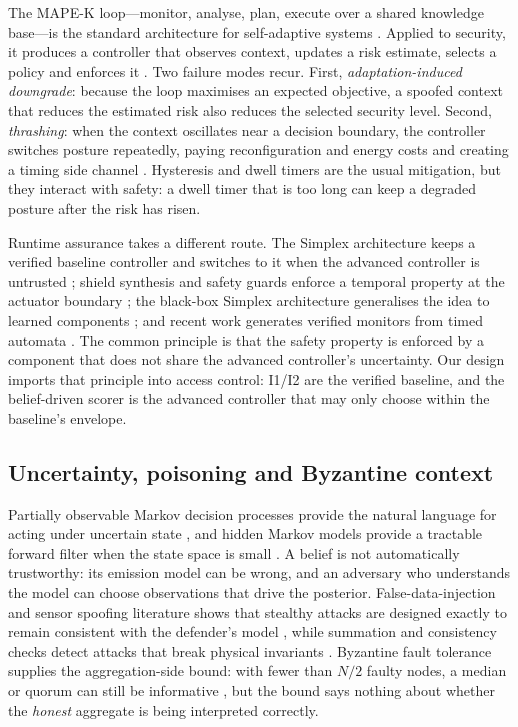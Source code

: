 The MAPE-K loop---monitor, analyse, plan, execute over a shared knowledge
base---is the standard architecture for self-adaptive systems
\cite{kephart2003vision,cheng2009software}. Applied to security, it produces a
controller that observes context, updates a risk estimate, selects a policy and
enforces it \cite{elgendi2019protecting}. Two failure modes recur. First,
\emph{adaptation-induced downgrade}: because the loop maximises an expected
objective, a spoofed context that reduces the estimated risk also reduces the
selected security level. Second, \emph{thrashing}: when the context oscillates
near a decision boundary, the controller switches posture repeatedly, paying
reconfiguration and energy costs and creating a timing side channel
\cite{kephart2003vision}. Hysteresis and dwell timers are the usual mitigation,
but they interact with safety: a dwell timer that is too long can keep a
degraded posture after the risk has risen.

Runtime assurance takes a different route. The Simplex architecture keeps a
verified baseline controller and switches to it when the advanced controller is
untrusted \cite{sha2001simplicity}; shield synthesis and safety guards enforce a
temporal property at the actuator boundary \cite{wu2017safety,wu2019shield}; the
black-box Simplex architecture generalises the idea to learned components
\cite{mehmood2022black}; and recent work generates verified monitors from timed
automata \cite{cho2025timed}. The common principle is that the safety property
is enforced by a component that does not share the advanced controller's
uncertainty. Our design imports that principle into access control: I1/I2 are the
verified baseline, and the belief-driven scorer is the advanced controller that
may only choose within the baseline's envelope.

\subsection{Uncertainty, poisoning and Byzantine context}

Partially observable Markov decision processes provide the natural language for
acting under uncertain state \cite{kaelbling1998planning}, and hidden Markov
models provide a tractable forward filter when the state space is small
\cite{rabiner1989tutorial}. A belief is not automatically trustworthy: its
emission model can be wrong, and an adversary who understands the model can
choose observations that drive the posterior. False-data-injection and sensor
spoofing literature shows that stealthy attacks are designed exactly to remain
consistent with the defender's model \cite{barua2020special,li2019optimal}, while
summation and consistency checks detect attacks that break physical invariants
\cite{ye2020summation}. Byzantine fault tolerance supplies the aggregation-side
bound: with fewer than $N/2$ faulty nodes, a median or quorum can still be
informative \cite{lamport1982byzantine}, but the bound says nothing about
whether the \emph{honest} aggregate is being interpreted correctly.

